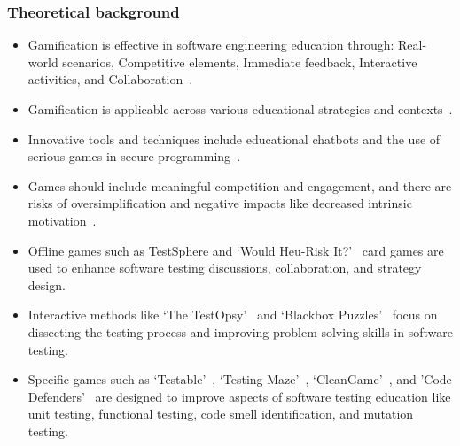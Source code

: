 \documentclass[aspectratio=169]{beamer}
\begin{document}
\begin{frame}[allowframebreaks]
    \frametitle{Theoretical background}
    \begin{itemize}
        \item Gamification is effective in software engineering education through: Real-world scenarios, Competitive elements, Immediate feedback, Interactive activities, and Collaboration~\cite{8658524}.
        \item Gamification is applicable across various educational strategies and contexts~\cite{informatics9040075, hirsh2022, Tan_Chong_2023}.%
        \item Innovative tools and techniques include educational chatbots and the use of serious games in secure programming~\cite{10.1145/3350768.3352456,8802503}.
        \item Games should include meaningful competition and engagement, and there are risks of oversimplification and negative impacts like decreased intrinsic motivation~\cite{8658524}.
        \item Offline games such as TestSphere and `Would Heu-Risk It?'~\cite{BibEntry2023Sep} card games are used to enhance software testing discussions, collaboration, and strategy design.
        \item Interactive methods like `The TestOpsy'~\cite{ChrisKenst2022Jun} and `Blackbox Puzzles'~\cite{BibEntry2022Feb} focus on dissecting the testing process and improving problem-solving skills in software testing.
        \item Specific games such as `Testable'~\cite{8994972}, `Testing Maze'~\cite{10.1145/3613372.3614191}, `CleanGame'~\cite{10.1145/3350768.3352490}, and 'Code Defenders'~\cite{10.1145/3287324.3287471, 9155973} are designed to improve aspects of software testing education like unit testing, functional testing, code smell identification, and mutation testing.
    \end{itemize}
\end{frame}
\end{document}
